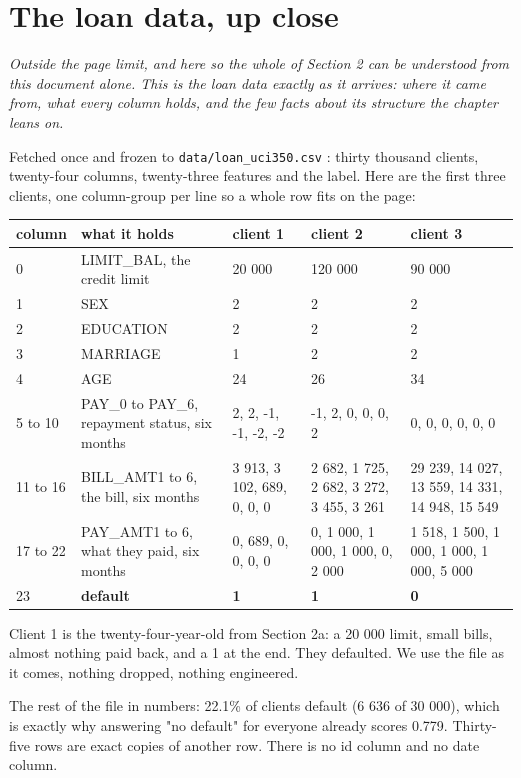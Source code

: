 \documentclass[11pt]{article} %
\begin{document}
\section{The loan data, up close}


\emph{Outside the page limit, and here so the whole of Section 2 can be understood from this document alone. This is the loan data exactly as it arrives: where it came from, what every column holds, and the few facts about its structure the chapter leans on.}

Fetched once and frozen to \texttt{data/loan\_uci350.csv} \cite{yeh:2009}: thirty thousand clients, twenty-four columns, twenty-three features and the label. Here are the first three clients, one column-group per line so a whole row fits on the page:

\begin{center}
\begin{tabular}{lllll}
\hline
column & what it holds & client 1 & client 2 & client 3 \\
\hline
0 & LIMIT\_BAL, the credit limit & 20 000 & 120 000 & 90 000 \\
1 & SEX & 2 & 2 & 2 \\
2 & EDUCATION & 2 & 2 & 2 \\
3 & MARRIAGE & 1 & 2 & 2 \\
4 & AGE & 24 & 26 & 34 \\
5 to 10 & PAY\_0 to PAY\_6, repayment status, six months & 2, 2, -1, -1, -2, -2 & -1, 2, 0, 0, 0, 2 & 0, 0, 0, 0, 0, 0 \\
11 to 16 & BILL\_AMT1 to 6, the bill, six months & 3 913, 3 102, 689, 0, 0, 0 & 2 682, 1 725, 2 682, 3 272, 3 455, 3 261 & 29 239, 14 027, 13 559, 14 331, 14 948, 15 549 \\
17 to 22 & PAY\_AMT1 to 6, what they paid, six months & 0, 689, 0, 0, 0, 0 & 0, 1 000, 1 000, 1 000, 0, 2 000 & 1 518, 1 500, 1 000, 1 000, 1 000, 5 000 \\
23 & \textbf{default} & \textbf{1} & \textbf{1} & \textbf{0} \\
\hline
\end{tabular}
\end{center}


Client 1 is the twenty-four-year-old from Section 2a: a 20 000 limit, small bills, almost nothing paid back, and a 1 at the end. They defaulted. We use the file as it comes, nothing dropped, nothing engineered.

The rest of the file in numbers: 22.1\% of clients default (6 636 of 30 000), which is exactly why answering "no default" for everyone already scores 0.779. Thirty-five rows are exact copies of another row. There is no id column and no date column.
\end{document}
